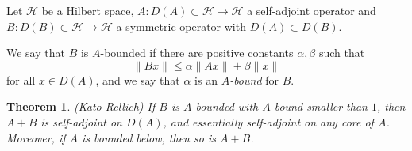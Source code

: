 \documentclass[12pt]{article}
\newtheorem{theorem*}{Theorem}
\begin{document}
Let $\mathcal{H}$ be a Hilbert space, $A\colon D(A)\subset \mathcal{H}\to
\mathcal{H}$ a self-adjoint operator and $B\colon D(B)\subset\mathcal{H}\to
\mathcal{H}$ a symmetric operator with $D(A)\subset D(B)$.

We say that $B$ is $A$-bounded if there are positive constants
$\alpha,\beta$ such that $$\|Bx\|\leq \alpha\|Ax\|+\beta\|x\|$$ for all
$x\in D(A)$, and we say that $\alpha$ is an \emph{$A$-bound} for $B$.

\begin{theorem*}(Kato-Rellich) If $B$ is \emph{$A$-bounded} with $A$-bound smaller
than $1$, then $A+B$ is self-adjoint on $D(A)$, and essentially
self-adjoint on any core of $A$. Moreover, if $A$ is bounded below, then
so is $A+B$.
\end{theorem*}
\end{document}
